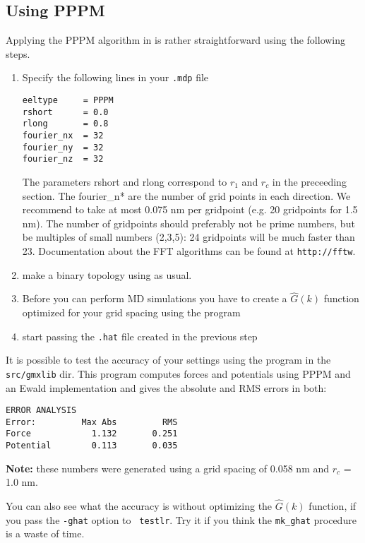 \subsection{Using PPPM}
Applying the PPPM algorithm in {\gromacs} is rather straightforward using the
following steps.
\begin{enumerate}
\item	Specify the following lines in your {\tt .mdp} file
\begin{verbatim}
eeltype		= PPPM
rshort		= 0.0
rlong		= 0.8
fourier_nx	= 32
fourier_ny	= 32
fourier_nz	= 32
\end{verbatim}
The parameters rshort and rlong correspond to $r_1$ and $r_c$ in the preceeding
section. The fourier\_n* are the number of grid points in each direction.
We recommend to take at most 0.075 nm per gridpoint (e.g. 20 gridpoints for 1.5 nm).
The number of gridpoints should preferably not be prime numbers, but be multiples
of small numbers (2,3,5): 24 gridpoints will be much faster than 23. Documentation
about the FFT algorithms can be found at 
{\tt http://fftw}.

\item 	make a binary topology using {\tt{}} as usual. 
\item	Before you can perform MD simulations you have to create a 
	$\hat{G}(k)$ function optimized for your grid spacing using the
	{\tt{}} program
\item	start {\tt{}} passing the {\tt .hat} file created in the
	previous step
\end{enumerate}

It is possible to test the accuracy of your settings using the program 
{\tt{}} in the {\tt src/gmxlib} dir. This program computes
forces and potentials using PPPM and an Ewald implementation and gives the
absolute and RMS errors in both:
\begin{verbatim}
ERROR ANALYSIS
Error:         Max Abs         RMS            
Force            1.132       0.251
Potential        0.113       0.035
\end{verbatim}
{\bf Note:} these numbers were generated using a grid spacing of
0.058 nm and $r_c$ = 1.0 nm.

You can also see what the accuracy is without optimizing the
$\hat{G}(k)$ function, if you pass the {\tt -ghat} option to {\tt
testlr}. Try it if you think the {\tt mk\_ghat} procedure is a waste
of time.
